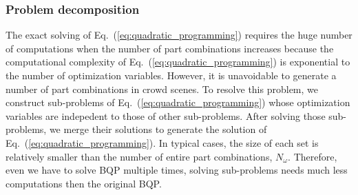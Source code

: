 \documentclass[10pt,twocolumn,letterpaper]{article}
\begin{document}
\subsubsection{Problem decomposition}
\label{subsubsec:problem_decomposition}
The exact solving of Eq.~(\ref{eq:quadratic_programming}) requires the huge number of computations when the number of part combinations increases because the computational complexity of Eq.~(\ref{eq:quadratic_programming}) is exponential to the number of optimization variables.
However, it is unavoidable to generate a number of part combinations in crowd scenes.
To resolve this problem, we construct sub-problems of Eq.~(\ref{eq:quadratic_programming}) whose optimization variables are indepedent to those of other sub-problems.
After solving those sub-problems, we merge their solutions to generate the solution of Eq.~(\ref{eq:quadratic_programming}).
In typical cases, the size of each set is relatively smaller than the number of entire part combinations, $N_{\omega}$.
Therefore, even we have to solve BQP multiple times, solving sub-problems needs much less computations then the original BQP.
\end{document}

